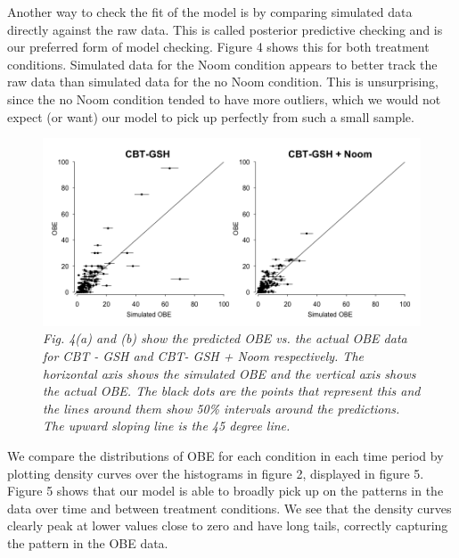 \documentclass{article}
\begin{document}
%
Another way to check the fit of the model is by comparing simulated data directly against the raw data.  This is called posterior predictive checking and is our preferred form of model checking. Figure 4 shows this for both treatment conditions.  Simulated data for the Noom condition appears to better track the raw data than simulated data for the no Noom condition.  This is unsurprising, since the no Noom condition tended to have more outliers, which we would not expect (or want) our model to pick up perfectly from such a small sample.  
%
\begin{figure}[H]
\begin{center}
\includegraphics[width=\textwidth, height=\textheight, keepaspectratio]{obe_ppcs.png}
\caption{\emph{Fig. 4(a) and (b) show the predicted OBE vs. the actual OBE data for CBT - GSH and CBT- GSH + Noom respectively. The horizontal axis shows the simulated OBE and the vertical axis shows the actual OBE. The black dots are the points that represent this and the lines around them show 50\% intervals around the predictions. The upward sloping line is the 45 degree line.}}
\end{center}
\end{figure}
%
We compare the distributions of OBE for each condition in each time period by plotting density curves over the histograms in figure 2, displayed in figure 5.   Figure 5 shows that our model is able to broadly pick up on the patterns in the data over time and between treatment conditions. We see that the density curves clearly peak at lower values close to zero and have long tails, correctly capturing the pattern in the OBE data.
\end{document}
